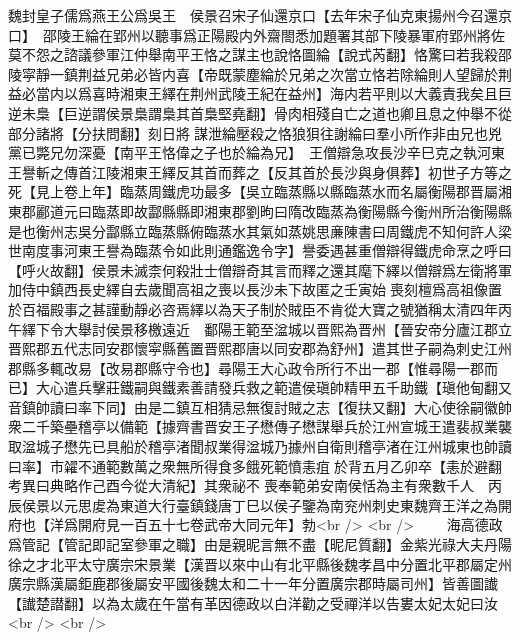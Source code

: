 魏封皇子儒爲燕王公爲吳王　侯景召宋子仙還京口【去年宋子仙克東揚州今召還京口】　邵陵王綸在郢州以聽事爲正陽殿内外齋閤悉加題署其部下陵暴軍府郢州將佐莫不怨之諮議參軍江仲舉南平王恪之謀主也說恪圖綸【說式芮翻】恪驚曰若我殺邵陵寜靜一鎮荆益兄弟必皆内喜【帝既蒙塵綸於兄弟之次當立恪若除綸則人望歸於荆益必當内以爲喜時湘東王繹在荆州武陵王紀在益州】海内若平則以大義責我矣且巨逆未梟【巨逆謂侯景梟謂梟其首梟堅堯翻】骨肉相殘自亡之道也卿且息之仲舉不從部分諸將【分扶問翻】刻日將謀泄綸壓殺之恪狼狽往謝綸曰羣小所作非由兄也兇黨已斃兄勿深憂【南平王恪偉之子也於綸為兄】　王僧辯急攻長沙辛巳克之執河東王譽斬之傳首江陵湘東王繹反其首而葬之【反其首於長沙與身俱葬】初世子方等之死【見上卷上年】臨蒸周鐵虎功最多【吳立臨蒸縣以縣臨蒸水而名屬衡陽郡晋屬湘東郡酈道元曰臨蒸即故酃縣縣即湘東郡劉昫曰隋改臨蒸為衡陽縣今衡州所治衡陽縣是也衡州志吳分酃縣立臨蒸縣俯臨蒸水其氣如蒸姚思亷陳書曰周鐵虎不知何許人梁世南度事河東王譽為臨蒸令如此則通鑑逸令字】譽委遇甚重僧辯得鐵虎命烹之呼曰【呼火故翻】侯景未滅柰何殺壯士僧辯奇其言而釋之還其麾下繹以僧辯爲左衛將軍加侍中鎮西長史繹自去歲聞高祖之喪以長沙未下故匿之壬寅始喪刻檀爲高祖像置於百福殿事之甚謹動靜必咨焉繹以為天子制於賊臣不肯從大寶之號猶稱太清四年丙午繹下令大舉討侯景移檄遠近　鄱陽王範至湓城以晋熙為晋州【晉安帝分廬江郡立晋熙郡五代志同安郡懷寜縣舊置晋熙郡唐以同安郡為舒州】遣其世子嗣為刺史江州郡縣多輒改易【改易郡縣守令也】尋陽王大心政令所行不出一郡【惟尋陽一郡而已】大心遣兵擊莊鐵嗣與鐵素善請發兵救之範遣侯瑱帥精甲五千助鐵【瑱他甸翻又音鎮帥讀曰率下同】由是二鎮互相猜忌無復討賊之志【復扶又翻】大心使徐嗣徽帥衆二千築壘稽亭以備範【據齊書晋安王子懋傳子懋謀舉兵於江州宣城王遣裴叔業襲取湓城子懋先已具船於稽亭渚聞叔業得湓城乃據州自衛則稽亭渚在江州城東也帥讀曰率】市糴不通範數萬之衆無所得食多餓死範憤恚疽於背五月乙卯卒【恚於避翻　考異曰典略作己酉今從大清紀】其衆祕不喪奉範弟安南侯恬為主有衆數千人　丙辰侯景以元思䖍為東道大行臺鎮錢唐丁巳以侯子鑒為南兖州刺史東魏齊王洋之為開府也【洋爲開府見一百五十七卷武帝大同元年】勃<br />
<br />
　　海高德政爲管記【管記即記室參軍之職】由是親昵言無不盡【昵尼質翻】金紫光祿大夫丹陽徐之才北平太守廣宗宋景業【漢晋以來中山有北平縣後魏孝昌中分置北平郡屬定州廣宗縣漢屬鉅鹿郡後屬安平國後魏太和二十一年分置廣宗郡時屬司州】皆善圖䜟【䜟楚譛翻】以為太歲在午當有革因德政以白洋勸之受禪洋以告婁太妃太妃曰汝<br />
<br />
